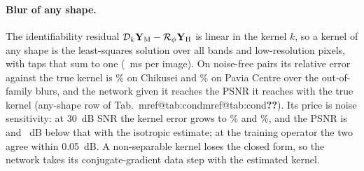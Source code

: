 \documentclass[10pt,twocolumn,letterpaper]{article}
\makeatletter
\newcommand{\mref}[1]{\ifcsname mref@#1\endcsname\csname mref@#1\endcsname\else\textbf{??}\fi}
\makeatother
\begin{document}

\paragraph{Blur of any shape.} The identifiability residual $\mathcal{D}_k\mathbf{Y}_{\mathrm{M}}-\mathcal{R}_\phi\mathbf{Y}_{\mathrm{H}}$ is linear in the kernel $k$, so a kernel of any shape is the least-squares solution over all bands and low-resolution pixels, with taps that sum to one (~ms per image). On noise-free pairs its relative error against the true kernel is \% on Chikusei and \% on Pavia Centre over the out-of-family blurs, and the network given it reaches the PSNR it reaches with the true kernel (any-shape row of Tab.~\mref{tab:cond}). Its price is noise sensitivity: at 30~dB SNR the kernel error grows to \% and \%, and the PSNR is  and ~dB below that with the isotropic estimate; at the training operator the two agree within 0.05~dB. A non-separable kernel loses the closed form, so the network takes its conjugate-gradient data step with the estimated kernel.

\end{document}
